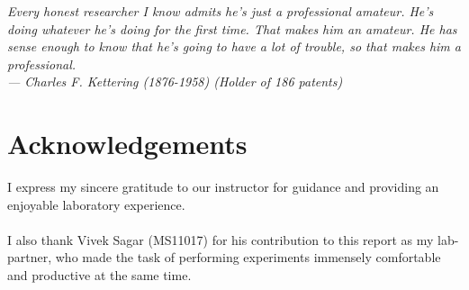 
\begin{flushright}{\slshape    
Every honest researcher I know admits he's just a professional amateur.
He's doing whatever he's doing for the first time. That makes him an amateur.
He has sense enough to know that he's going to have a lot of trouble,
so that makes him a professional.\\ \medskip
--- Charles F. Kettering (1876-1958) (Holder of 186 patents)}
\end{flushright}



\bigskip

\begingroup
\let\clearpage\relax
\let\cleardoublepage\relax
\let\cleardoublepage\relax
\chapter*{Acknowledgements}
I express my sincere gratitude to our instructor \myProf for guidance and providing an enjoyable laboratory experience.\\
 \\
I also thank Vivek Sagar (MS11017) for his contribution to this report as my lab-partner, who made the task of performing experiments immensely comfortable and productive at the same time.\\
\bigskip


\endgroup



